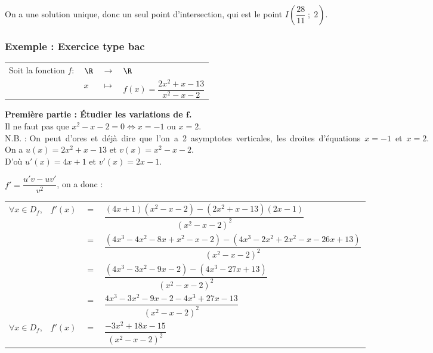 On a une solution unique, donc un seul point d'intersection, qui est le point $I(\dfrac{28}{11} \; ; \; 2)$.

\newpage

\vspace*{-1.5cm}

\subsubsection{Exemple  : Exercice type bac}

\begin{tabular}{llll}
Soit la fonction $f :$ & $\R$ & $\longrightarrow$ & $\R$ \\
& $x$ & $\longmapsto$ & $f(x) = \dfrac{2x^2 + x -13}{x^2 - x - 2}$ \\
\end{tabular}

\vspace*{.3cm}

\textbf{Première partie : Étudier les variations de $\mathbf{f}$.} \\

Il ne faut pas que $x^2 - x - 2 = 0 \Longleftrightarrow x = -1$ ou $x = 2$. \\

N.B. : \hbox{On peut d'ores et déjà dire que l'on a 2 asymptotes verticales, les droites d'équations $x = -1$ et $x = 2$.} \\ 

On a $u(x) = 2x^2 + x -13$ et $v(x) = x^2 - x - 2$. \\
D'où $u'(x) = 4x +1 $ et $v'(x) = 2x -1 $. 

\vspace*{.3cm}

$f' = \dfrac{u'v - uv'}{v^2}$, on a donc :

\begin{tabular}{llll}
$\forall x \in D_f$, & $f'(x)$ & $=$ & $\dfrac{\left(4x + 1\right)\left(x^2 - x -2\right)-\left(2x^2 + x - 13\right)\left(2x - 1\right)}{\left(x^2 - x - 2\right)^2}$ \vspace*{.3cm} \\
& & $=$ & $\dfrac{\left(4x^3 - 4x^2 - 8x + x^2 - x - 2\right)-\left(4x^3 - 2x^2 + 2x^2 - x - 26x + 13\right)}{\left(x^2 - x - 2\right)^2}$ \vspace*{.3cm} \\
& & $=$ & $\dfrac{\left(4x^3 - 3x^2 - 9x - 2\right)-\left(4x^3 - 27x + 13\right)}{\left(x^2 - x - 2\right)^2}$ \vspace*{.3cm} \\
& & $=$ & $\dfrac{4x^3 - 3x^2 - 9x - 2 - 4x^3 + 27x - 13}{\left(x^2 - x - 2\right)^2}$ \vspace*{.3cm} \\
$\forall x \in D_f$, & $f'(x)$ & $=$ & $\dfrac{-3x^2 + 18x - 15}{\left(x^2 - x - 2\right)^2}$ \vspace*{.3cm} \\
\end{tabular}

